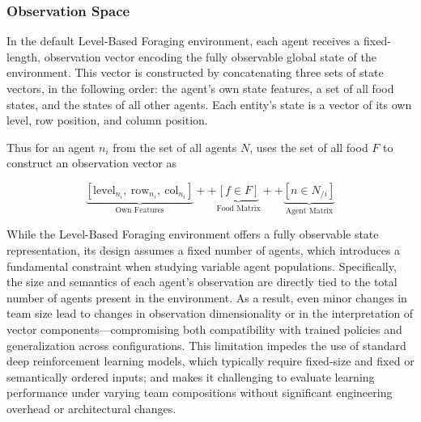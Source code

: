 \documentclass{article}
\begin{document}
\subsubsection{Observation Space}

In the default Level-Based Foraging environment, each agent receives a fixed-length, 
observation vector encoding the fully observable global state of the environment. 
This vector is constructed by concatenating three sets of state vectors, in the following order: 
the agent's own state features, a set of all food states, and the states of all other agents.
Each entity's state is a vector of its own level, row position, and column position.

Thus for an agent \(n_i\) from the set of all agents \(N\), 
uses the set of all food \(F\) to construct an observation vector as

\[
\underbrace{[\text{level}_{n_i},\ \text{row}_{n_i},\ \text{col}_{n_i}]}_{\text{Own Features}}
++
\underbrace{[f \in F]}_{\text{Food Matrix}} 
++
\underbrace{[n \in N_{/i}]}_{\text{Agent Matrix}}
\]

While the Level-Based Foraging environment offers a fully observable state representation, 
its design assumes a fixed number of agents, which introduces a fundamental constraint when 
studying variable agent populations. 
Specifically, the size and semantics of each agent's observation are directly tied to the 
total number of agents present in the environment. 
As a result, even minor changes in team size lead to changes in observation dimensionality 
or in the interpretation of vector components—compromising both compatibility with 
trained policies and generalization across configurations. 
This limitation impedes the use of standard deep reinforcement learning models, 
which typically require fixed-size and fixed or semantically ordered inputs;
and makes it challenging to evaluate learning performance under varying team 
compositions without significant engineering overhead or architectural changes.



\end{document}
